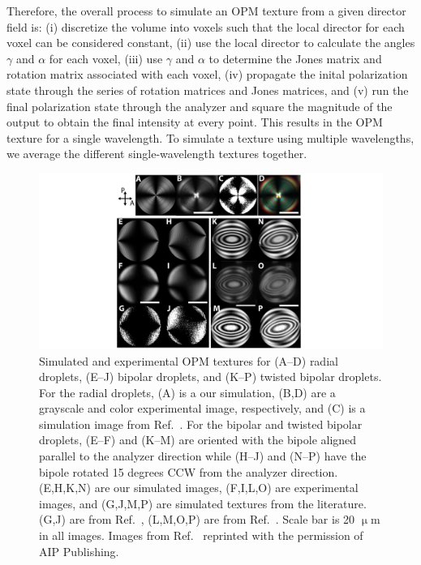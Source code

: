 Therefore, the overall process to simulate an OPM texture from a given director field is: (i) discretize the volume into voxels such that the local director for each voxel can be considered constant, (ii) use the local director to calculate the angles $\gamma$ and $\alpha$ for each voxel, (iii) use $\gamma$ and $\alpha$ to determine the Jones matrix and rotation matrix associated with each voxel, (iv) propagate the inital polarization state through the series of rotation matrices and Jones matrices, and (v) run the final polarization state through the analyzer and square the magnitude of the output to obtain the final intensity at every point.
This results in the OPM texture for a single wavelength.
To simulate a texture using multiple wavelengths, we average the different single-wavelength textures together.
\begin{figure}
\centering
\includegraphics{figures/C4/Ch4-Figs_JonesSphere.png}
\caption{Simulated and experimental OPM textures for (A--D) radial droplets, (E--J) bipolar droplets, and (K--P) twisted bipolar droplets.
For the radial droplets, (A) is a our simulation, (B,D) are a grayscale and color experimental image, respectively, and (C) is a simulation image from Ref.~\cite{RN310}.
For the bipolar and twisted bipolar  droplets, (E--F) and (K--M) are oriented with the bipole aligned parallel to the analyzer direction while (H--J) and (N--P) have the bipole rotated 15 degrees CCW from the analyzer direction. (E,H,K,N) are our simulated images, (F,I,L,O) are experimental images, and (G,J,M,P) are simulated textures from the literature.
(G,J) are from Ref.~\cite{RN310}, (L,M,O,P) are from Ref.~\cite{RN193}.
Scale bar is 20 $\upmu$m in all images.
Images from Ref.~\cite{RN310} reprinted with the permission of AIP Publishing.
}\label{f:4-spherecomparison}
\end{figure}

